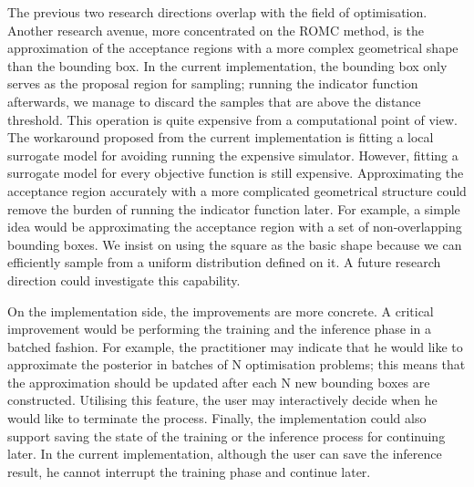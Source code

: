 The previous two research directions overlap with the field of
optimisation. Another research avenue, more concentrated on the ROMC
method, is the approximation of the acceptance regions with a more
complex geometrical shape than the bounding box. In the current
implementation, the bounding box only serves as the proposal region
for sampling; running the indicator function afterwards, we manage to
discard the samples that are above the distance threshold. This
operation is quite expensive from a computational point of view. The
workaround proposed from the current implementation is fitting a local
surrogate model for avoiding running the expensive simulator. However,
fitting a surrogate model for every objective function is still
expensive. Approximating the acceptance region accurately with a more
complicated geometrical structure could remove the burden of running
the indicator function later. For example, a simple idea would be
approximating the acceptance region with a set of non-overlapping
bounding boxes. We insist on using the square as the basic shape
because we can efficiently sample from a uniform distribution defined
on it. A future research direction could investigate this capability.


On the implementation side, the improvements are more concrete. A critical
improvement would be performing the training and the inference phase
in a batched fashion. For example, the practitioner may indicate that
he would like to approximate the posterior in batches of N
optimisation problems; this means that the approximation should be
updated after each N new bounding boxes are constructed. Utilising
this feature, the user may interactively decide when he would like to
terminate the process. Finally, the implementation could also support
saving the state of the training or the inference process for
continuing later. In the current implementation, although the user can
save the inference result, he cannot interrupt the training phase and
continue later.